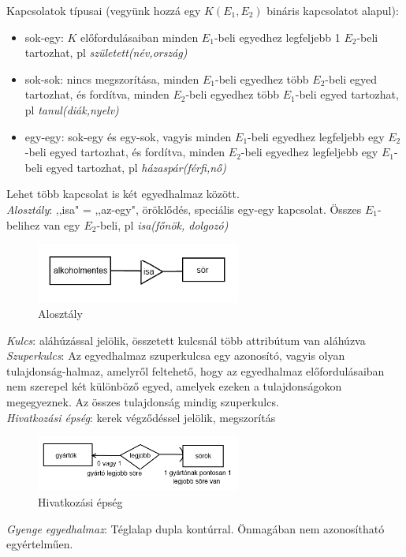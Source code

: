 \documentclass[margin=0px]{article}
\begin{document}
	Kapcsolatok típusai (vegyünk hozzá egy $K(E_1,E_2)$ bináris kapcsolatot alapul):
	\begin{itemize}
		\item sok-egy: $K$ előfordulásaiban minden $E_1$-beli egyedhez legfeljebb 1 $E_2$-beli tartozhat, pl \textit{született(név,ország)}
		\item sok-sok: nincs megszorítása, minden $E_1$-beli egyedhez több $E_2$-beli egyed tartozhat, és fordítva, minden $E_2$-beli egyedhez több $E_1$-beli egyed tartozhat, pl \textit{tanul(diák,nyelv)}
		\item egy-egy: sok-egy és egy-sok, vagyis minden $E_1$-beli egyedhez legfeljebb egy $E_2$-beli egyed tartozhat, és fordítva, minden $E_2$-beli egyedhez legfeljebb egy $E_1$-beli egyed tartozhat, pl \textit{házaspár(férfi,nő)}
	\end{itemize}
	Lehet több kapcsolat is két egyedhalmaz között. \\
	\textit{Alosztály}: ,,isa" = ,,az-egy", öröklődés, speciális egy-egy kapcsolat. Összes $E_1$-belihez van egy $E_2$-beli, pl \textit{isa(főnök, dolgozó)}
	\begin{figure}[H]
		\centering
		\includegraphics[width=0.6\textwidth]{img/ek2.png}
		\caption{Alosztály}
	\end{figure}
	\textit{Kulcs}: aláhúzással jelölik, összetett kulcsnál több attribútum van aláhúzva \\
	\textit{Szuperkulcs}: Az egyedhalmaz szuperkulcsa egy azonosító, vagyis olyan tulajdonság-halmaz, amelyről feltehető, hogy az egyedhalmaz előfordulásaiban nem szerepel két különböző	egyed, amelyek ezeken a tulajdonságokon megegyeznek. Az összes tulajdonság mindig szuperkulcs.\\
	\textit{Hivatkozási épség}: kerek végződéssel jelölik, megszorítás
	\begin{figure}[H]
		\centering
		\includegraphics[width=0.6\textwidth]{img/ek3.png}
		\caption{Hivatkozási épség}
	\end{figure}
	\textit{Gyenge egyedhalmaz}: Téglalap dupla kontúrral. Önmagában nem azonosítható egyértelműen.
\end{document}
